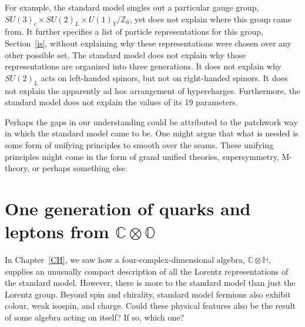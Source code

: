 \documentclass[letterpaper,12pt,titlepage,oneside,final]{book}
\newcommand{\CH}{\mathbb{C}\otimes\mathbb{H}}
\newcommand{\CO}{\mathbb{C}\otimes\mathbb{O}}
\begin{document}
For example, the standard model singles out a particular gauge group, $SU(3)_c\times SU(2)_L\times U(1)_{Y}/{\mathbb{Z}_6}$, yet does not explain where this group came from.  It further specifies a list of particle representations for this group, Section~\ref{is}, without explaining why these representations were chosen over any other possible set.  The standard model does not explain why those representations are organized into three generations.  It does not explain why $SU(2)_L$ acts on left-handed spinors, but not on right-handed spinors.   It does not explain the apparently ad hoc arrangement of hypercharges.  Furthermore, the standard model does not explain the values of its 19 parameters.




Perhaps the gaps in our understanding could be attributed to the patchwork way in which the standard model came to be.  One might argue that what is needed is some form of unifying principles to smooth over the seams.  These unifying principles might come in the form of grand unified theories, supersymmetry, M-theory, or perhaps something else.


\chapter{One generation of quarks and leptons from $\CO$\label{CO}  }


In Chapter~\ref{CH}, we saw how a four-complex-dimensional algebra, $\CH$, supplies an unusually compact description of all the Lorentz representations of the standard model.     However, there is more to the standard model than just the Lorentz group.   Beyond spin and chirality, standard model fermions also exhibit colour, weak isospin, and charge.  Could these physical features also be the result of some algebra acting on itself?  If so, which one?
\end{document}
